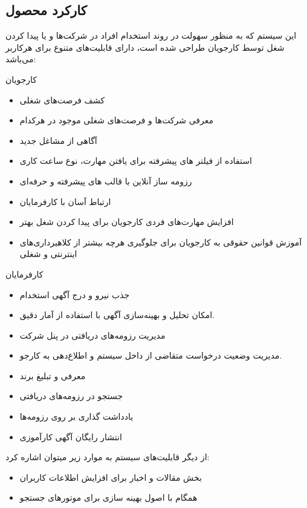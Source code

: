\documentclass[12pt,svgnames,oneside]{book}
\newcounter{itemadded}
\let\LaTeXStandardEnumerateBegin\enumerate
\let\LaTeXStandardEnumerateEnd\endenumerate
\renewenvironment{enumerate}{%
	\LaTeXStandardEnumerateBegin%
	\setcounter{itemadded}{0}
}{%
	\LaTeXStandardEnumerateEnd%
}%
\begin{document}
			\subsection{کارکرد محصول}
				این سیستم که به منظور سهولت در روند استخدام افراد در شرکت‌ها و یا پیدا کردن شغل توسط کارجویان طراحی شده‌ است، دارای قابلیت‌های متنوع برای هرکاربر می‌باشد:
				\begin{enumerate}
					\item کارجویان
						\begin{itemize}
							\item
							کشف فرصت‌های شغلی
							\item
							معرفی شرکت‌ها و فرصت‌های شغلی موجود در هرکدام
							\item
							آگاهی از مشاغل جدید
							\item
							استفاده از فیلتر های پیشرفته برای یافتن مهارت، نوع ساعت کاری
							\item
							رزومه ساز آنلاین با قالب های پیشرفته و حرفه‌ای
							\item
							 ارتباط آسان با کارفرمایان
							\item
							افزایش  مهارت‌های فردی کارجویان برای پیدا کردن شغل بهتر
							\item
							آموزش قوانین حقوقی به کارجویان برای جلوگیری هرچه بیشتر از کلاهبرداری‌های اینترنتی و شغلی
						\end{itemize}

					\item کارفرمایان
						\begin{itemize}
							\item
							جذب نیرو و درج آگهی استخدام
							\item
							امکان تحلیل و بهینه‌سازی آگهی با استفاده از آمار دقیق.
							\item
							مدیریت رزومه‌های دریافتی در پنل شرکت
							\item
							مدیریت وضعیت درخواست متقاضی از داخل سیستم و اطلاع‌دهی به کارجو.
							\item
							معرفی و تبلیغ برند
							\item
							جستجو در رزومه‌های دریافتی
							\item
							یادداشت گذاری بر روی رزومه‌ها
							\item
							انتشار رایگان آگهی‌ کارآموزی
						\end{itemize}
				\end{enumerate}

			از دیگر قابلیت‌های سیستم به موارد زیر میتوان اشاره کرد:
			\begin{itemize}
				\item بخش مقالات و اخبار برای افزایش اطلاعات کاربران
				\item همگام با اصول بهینه سازی برای موتورهای جستجو
			\end{itemize}
\end{document}
